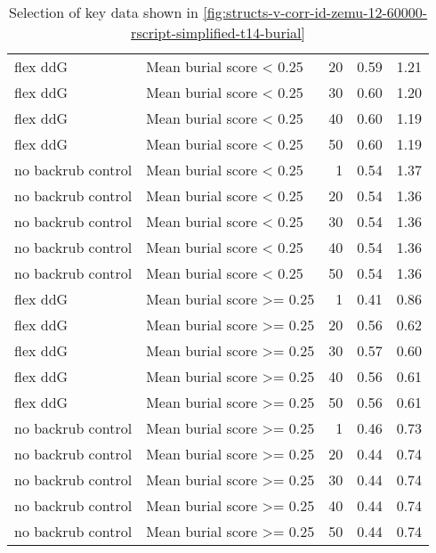 \begin{table}
\begin{tabular}{llrrr}
           flex ddG &   Mean burial score < 0.25 &      20 & 0.59 & 1.21 \\
           flex ddG &   Mean burial score < 0.25 &      30 & 0.60 & 1.20 \\
           flex ddG &   Mean burial score < 0.25 &      40 & 0.60 & 1.19 \\
           flex ddG &   Mean burial score < 0.25 &      50 & 0.60 & 1.19 \\
 no backrub control &   Mean burial score < 0.25 &       1 & 0.54 & 1.37 \\
 no backrub control &   Mean burial score < 0.25 &      20 & 0.54 & 1.36 \\
 no backrub control &   Mean burial score < 0.25 &      30 & 0.54 & 1.36 \\
 no backrub control &   Mean burial score < 0.25 &      40 & 0.54 & 1.36 \\
 no backrub control &   Mean burial score < 0.25 &      50 & 0.54 & 1.36 \\
           flex ddG &  Mean burial score >= 0.25 &       1 & 0.41 & 0.86 \\
           flex ddG &  Mean burial score >= 0.25 &      20 & 0.56 & 0.62 \\
           flex ddG &  Mean burial score >= 0.25 &      30 & 0.57 & 0.60 \\
           flex ddG &  Mean burial score >= 0.25 &      40 & 0.56 & 0.61 \\
           flex ddG &  Mean burial score >= 0.25 &      50 & 0.56 & 0.61 \\
 no backrub control &  Mean burial score >= 0.25 &       1 & 0.46 & 0.73 \\
 no backrub control &  Mean burial score >= 0.25 &      20 & 0.44 & 0.74 \\
 no backrub control &  Mean burial score >= 0.25 &      30 & 0.44 & 0.74 \\
 no backrub control &  Mean burial score >= 0.25 &      40 & 0.44 & 0.74 \\
 no backrub control &  Mean burial score >= 0.25 &      50 & 0.44 & 0.74 \\
\bottomrule
\end{tabular}

\caption[]{Selection of key data shown in \cref{fig:structs-v-corr-id-zemu-12-60000-rscript-simplified-t14-burial}}
\label{tab:structs-v-corr-id-zemu-12-60000-rscript-simplified-t14-burial-underlying-data}
\end{table}
